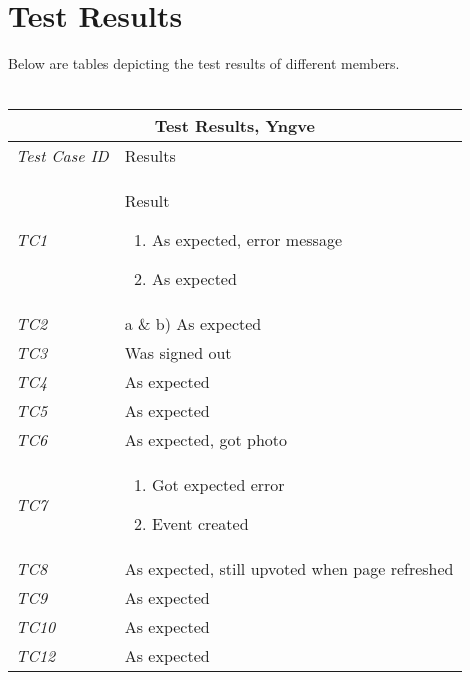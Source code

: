 \section{Test Results}
\label{sec:TestingResults}
%
Below are tables depicting the test results of different members. \\ \\
%
\begin{minipage}{\linewidth}
\setlength{\tabcolsep}{15pt}
\centering
{}
\begin{tabular}{ |l|p{70mm}| }
	\hline
	\multicolumn{2}{|c|}{\cellcolor{gray!25} \textbf{Test Results, Yngve}} \\
	\hline
	\it{\cellcolor{gray!25}Test Case ID} & {\cellcolor{gray!25} Results } \\
	\hline
	\it{\cellcolor{gray!25}TC1} & Result \begin{enumerate}[label=\alph*)]
	                                       \item As expected, error message
	                                       \item As expected
	                                     \end{enumerate}\\ \hline
	\it{\cellcolor{gray!25}TC2}  & a \& b) As expected \\ \hline
	\it{\cellcolor{gray!25}TC3} & Was signed out \\ \hline
	\it{\cellcolor{gray!25}TC4} & As expected \\ \hline
	\it{\cellcolor{gray!25}TC5} & As expected \\ \hline
	\it{\cellcolor{gray!25}TC6} & As expected, got photo \\ \hline
	\it{\cellcolor{gray!25}TC7} & \begin{enumerate}[label=\alph*)]
	                                \item Got expected error
	                                \item Event created
                                  \end{enumerate}\\ \hline
	\it{\cellcolor{gray!25}TC8} & As expected, still upvoted when page refreshed \\ \hline
	\it{\cellcolor{gray!25}TC9} & As expected \\ \hline
	\it{\cellcolor{gray!25}TC10} & As expected \\ \hline
	\it{\cellcolor{gray!25}TC12} & As expected \\ \hline

\end{tabular}
\end{minipage}
